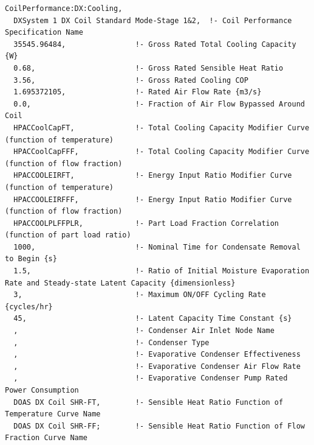 \begin{lstlisting}
CoilPerformance:DX:Cooling,
  DXSystem 1 DX Coil Standard Mode-Stage 1&2,  !- Coil Performance Specification Name
  35545.96484,                !- Gross Rated Total Cooling Capacity {W}
  0.68,                       !- Gross Rated Sensible Heat Ratio
  3.56,                       !- Gross Rated Cooling COP
  1.695372105,                !- Rated Air Flow Rate {m3/s}
  0.0,                        !- Fraction of Air Flow Bypassed Around Coil
  HPACCoolCapFT,              !- Total Cooling Capacity Modifier Curve (function of temperature)
  HPACCoolCapFFF,             !- Total Cooling Capacity Modifier Curve (function of flow fraction)
  HPACCOOLEIRFT,              !- Energy Input Ratio Modifier Curve (function of temperature)
  HPACCOOLEIRFFF,             !- Energy Input Ratio Modifier Curve (function of flow fraction)
  HPACCOOLPLFFPLR,            !- Part Load Fraction Correlation (function of part load ratio)
  1000,                       !- Nominal Time for Condensate Removal to Begin {s}
  1.5,                        !- Ratio of Initial Moisture Evaporation Rate and Steady-state Latent Capacity {dimensionless}
  3,                          !- Maximum ON/OFF Cycling Rate {cycles/hr}
  45,                         !- Latent Capacity Time Constant {s}
  ,                           !- Condenser Air Inlet Node Name
  ,                           !- Condenser Type
  ,                           !- Evaporative Condenser Effectiveness
  ,                           !- Evaporative Condenser Air Flow Rate
  ,                           !- Evaporative Condenser Pump Rated Power Consumption
  DOAS DX Coil SHR-FT,        !- Sensible Heat Ratio Function of Temperature Curve Name
  DOAS DX Coil SHR-FF;        !- Sensible Heat Ratio Function of Flow Fraction Curve Name


\end{lstlisting}
